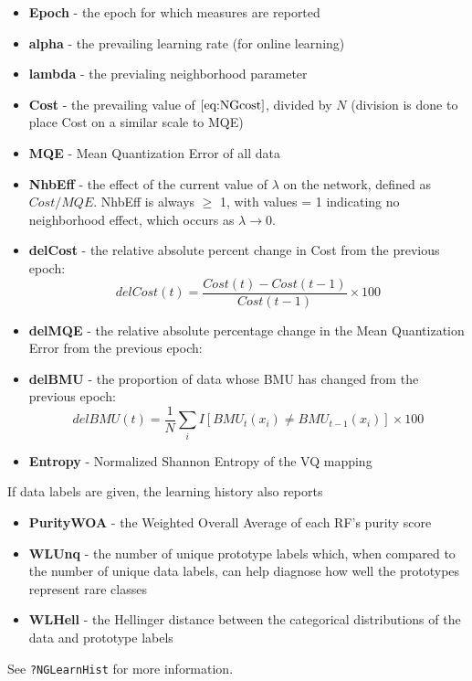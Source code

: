 \documentclass[11pt,]{article}
\providecommand{\tightlist}{%
\setlength{\itemsep}{0pt}\setlength{\parskip}{0pt}}
\begin{document}
\begin{itemize}
\tightlist
\item
  \textbf{Epoch} - the epoch for which measures are reported
\item
  \textbf{alpha} - the prevailing learning rate (for online learning)
\item
  \textbf{lambda} - the previaling neighborhood parameter
\item
  \textbf{Cost} - the prevailing value of \(\eqref{eq:NGcost}\), divided
  by \(N\) (division is done to place Cost on a similar scale to MQE)
\item
  \textbf{MQE} - Mean Quantization Error of all data
\item
  \textbf{NhbEff} - the effect of the current value of \(\lambda\) on
  the network, defined as \(Cost / MQE\). NhbEff is always \(\geq\) 1,
  with values = 1 indicating no neighborhood effect, which occurs as
  \(\lambda \to 0\).
\item
  \textbf{delCost} - the relative absolute percent change in Cost from
  the previous epoch:
  \[delCost(t) = \frac{Cost(t) - Cost(t-1)}{Cost(t-1)} \times 100\]
\item
  \textbf{delMQE} - the relative absolute percentage change in the Mean
  Quantization Error from the previous epoch:
\item
  \textbf{delBMU} - the proportion of data whose BMU has changed from
  the previous epoch:
  \[delBMU(t) = \frac{1}{N} \sum\limits_i I \left[ BMU_t(x_i) \neq BMU_{t-1}(x_i) \right] \times 100 \]
\item
  \textbf{Entropy} - Normalized Shannon Entropy of the VQ mapping
\end{itemize}

If data labels are given, the learning history also reports

\begin{itemize}
\tightlist
\item
  \textbf{PurityWOA} - the Weighted Overall Average of each RF's purity
  score
\item
  \textbf{WLUnq} - the number of unique prototype labels which, when
  compared to the number of unique data labels, can help diagnose how
  well the prototypes represent rare classes
\item
  \textbf{WLHell} - the Hellinger distance between the categorical
  distributions of the data and prototype labels
\end{itemize}

See \texttt{?NGLearnHist} for more information.
\end{document}
